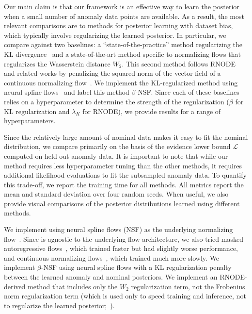 Our main claim is that our \ouralg{} framework is an effective way to learn the posterior when a small number of anomaly data points are available. As a result, the most relevant comparisons are to methods for posterior learning with dataset bias, which typically involve regularizing the learned posterior. In particular, we compare against two baselines: a ``state-of-the-practice'' method regularizing the KL divergence~\cite{asimInvertibleGenerativeModels2020,higginsBetaVAELearningBasic2016} and a state-of-the-art method specific to normalizing flows that regularizes the Wasserstein distance $W_2$. This second method follows RNODE and related works by penalizing the squared norm of the vector field of a continuous normalizing flow~\cite{finlayHowTrainYour2020,onkenOTFlowFastAccurate2021}. We implement the KL-regularized method using neural spline flows~\cite{durkanNeuralSplineFlows2019} and label this method $\beta$-NSF. Since each of these baselines relies on a hyperparameter to determine the strength of the regularization ($\beta$ for KL regularization and $\lambda_K$ for RNODE), we provide results for a range of hyperparameters.

Since the relatively large amount of nominal data makes it easy to fit the nominal distribution, we compare primarily on the basis of the evidence lower bound $\mathcal{L}$ computed on held-out anomaly data. It is important to note that while our method requires less hyperparameter tuning than the other methods, it requires additional likelihood evaluations to fit the subsampled anomaly data. To quantify this trade-off, we report the training time for all methods. All metrics report the mean and standard deviation over four random seeds. When useful, we also provide visual comparisons of the posterior distributions learned using different methods.

We implement \ouralg{} using neural spline flows (NSF) as the underlying normalizing flow~\cite{durkanNeuralSplineFlows2019}. Since \ouralg{} is agnostic to the underlying flow architecture, we also tried masked autoregressive flows~\cite{huangNeuralAutoregressiveFlows2018}, which trained faster but had slightly worse performance, and continuous normalizing flows~\cite{chenNeuralOrdinaryDifferential2018}, which trained much more slowly.
%
We implement $\beta$-NSF using neural spline flows with a KL regularization penalty between the learned anomaly and nominal posteriors. We implement an RNODE-derived method that includes only the $W_2$ regularization term, not the Frobenius norm regularization term (which is used only to speed training and inference, not to regularize the learned posterior;~\cite{finlayHowTrainYour2020}).

